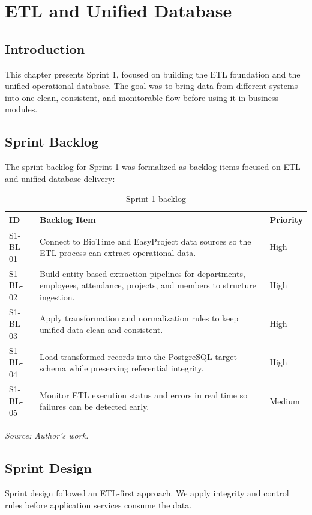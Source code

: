 \chapter{ETL and Unified Database}
\minitoc
\clearpage

\section{Introduction}
This chapter presents Sprint 1, focused on building the ETL foundation and the unified operational database. The goal was to bring data from different systems into one clean, consistent, and monitorable flow before using it in business modules.

\section{Sprint Backlog}
The sprint backlog for Sprint 1 was formalized as backlog items focused on ETL and unified database delivery:

\begin{table}[H]
\centering
\renewcommand{\arraystretch}{1.2}
\begin{tabular}{|l|>{\raggedright\arraybackslash}p{9.0cm}|l|}
\hline
\textbf{ID} & \textbf{Backlog Item} & \textbf{Priority} \\
\hline
S1-BL-01 & Connect to BioTime and EasyProject data sources so the ETL process can extract operational data. & High \\
\hline
S1-BL-02 & Build entity-based extraction pipelines for departments, employees, attendance, projects, and members to structure ingestion. & High \\
\hline
S1-BL-03 & Apply transformation and normalization rules to keep unified data clean and consistent. & High \\
\hline
S1-BL-04 & Load transformed records into the PostgreSQL target schema while preserving referential integrity. & High \\
\hline
S1-BL-05 & Monitor ETL execution status and errors in real time so failures can be detected early. & Medium \\
\hline
\end{tabular}
\caption{Sprint 1 backlog}
\label{tab:sprint-1-backlog}
{\footnotesize\textit{Source: Author's work.}}
\end{table}

\section{Sprint Design}
Sprint design followed an ETL-first approach. We apply integrity and control rules before application services consume the data.

